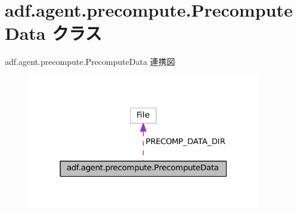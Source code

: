 \hypertarget{classadf_1_1agent_1_1precompute_1_1PrecomputeData}{}\section{adf.\+agent.\+precompute.\+Precompute\+Data クラス}
\label{classadf_1_1agent_1_1precompute_1_1PrecomputeData}


adf.\+agent.\+precompute.\+Precompute\+Data 連携図
\nopagebreak
\begin{figure}[H]
\begin{center}
\leavevmode
\includegraphics[width=289pt]{classadf_1_1agent_1_1precompute_1_1PrecomputeData__coll__graph}
\end{center}
\end{figure}
